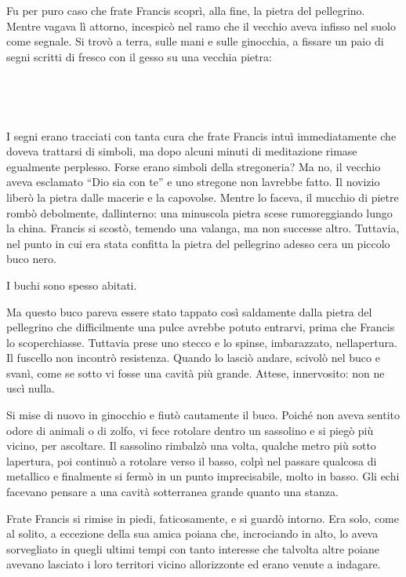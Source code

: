 Fu per puro caso che frate Francis scoprì, alla fine, la pietra del
pellegrino. Mentre vagava lì attorno, incespicò nel ramo che il vecchio
aveva infisso nel suolo come segnale. Si trovò a terra, sulle mani e
sulle ginocchia, a fissare un paio di segni scritti di fresco con il
gesso su una vecchia pietra:

\begin{center}
	{\Huge{}}
\end{center}\

~

I segni erano tracciati con tanta cura che frate Francis intuì
immediatamente che doveva trattarsi di simboli, ma dopo alcuni minuti di
meditazione rimase egualmente perplesso. Forse erano simboli della
stregoneria? Ma no, il vecchio aveva esclamato ``Dio sia con te'' e uno
stregone non l\textquotesingle avrebbe fatto. Il novizio liberò la
pietra dalle macerie e la capovolse. Mentre lo faceva, il mucchio di
pietre rombò debolmente, dall\textquotesingle interno: una minuscola
pietra scese rumoreggiando lungo la china. Francis si scostò, temendo
una valanga, ma non successe altro. Tuttavia, nel punto in cui era stata
confitta la pietra del pellegrino adesso c\textquotesingle era un
piccolo buco nero.

I buchi sono spesso abitati.

Ma questo buco pareva essere stato tappato così saldamente dalla pietra
del pellegrino che difficilmente una pulce avrebbe potuto entrarvi,
prima che Francis lo scoperchiasse. Tuttavia prese uno stecco e lo
spinse, imbarazzato, nell\textquotesingle apertura. Il fuscello non
incontrò resistenza. Quando lo lasciò andare, scivolò nel buco e svanì,
come se sotto vi fosse una cavità più grande. Attese, innervosito: non
ne uscì nulla.

Si mise di nuovo in ginocchio e fiutò cautamente il buco. Poiché non
aveva sentito odore di animali o di zolfo, vi fece rotolare dentro un
sassolino e si piegò più vicino, per ascoltare. Il sassolino rimbalzò
una volta, qualche metro più sotto l\textquotesingle apertura, poi
continuò a rotolare verso il basso, colpì nel passare qualcosa di
metallico e finalmente si fermò in un punto imprecisabile, molto in
basso. Gli echi facevano pensare a una cavità sotterranea grande quanto
una stanza.

Frate Francis si rimise in piedi, faticosamente, e si guardò intorno.
Era solo, come al solito, a eccezione della sua amica poiana che,
incrociando in alto, lo aveva sorvegliato in quegli ultimi tempi con
tanto interesse che talvolta altre poiane avevano lasciato i loro
territori vicino all\textquotesingle orizzonte ed erano venute a
indagare.


